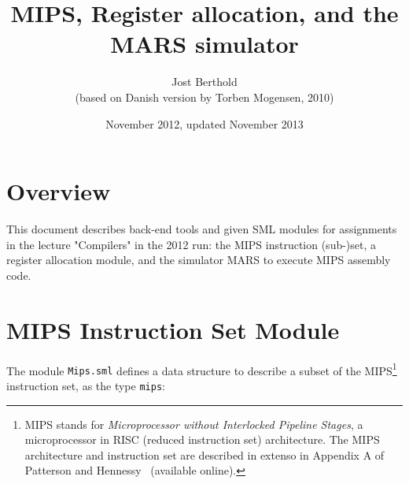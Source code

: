 \documentclass[11pt,a4paper]{article}
\title{MIPS, Register allocation, and the MARS simulator}
\author{Jost Berthold\\ (based on Danish version by Torben Mogensen, 2010)}
\date{November 2012, updated November 2013}
\newcommand{\codesize}{\scriptsize}
\newcommand{\cd}[1]{{{\codesize\tt #1}}}
\begin{document}
\setlength{\parindent}{0.2em}

\maketitle


\section*{Overview}

This document describes back-end tools and given SML modules for assignments 
in the lecture "Compilers" in the 2012 run: the MIPS instruction (sub-)set,
a register allocation module, and the simulator MARS to execute MIPS assembly code.

\tableofcontents

\section{MIPS Instruction Set Module}

The module \cd{Mips.sml} defines a data structure to describe a subset of the 
MIPS\footnote{MIPS stands for \emph{Microprocessor without 
Interlocked Pipeline Stages}, a microprocessor in RISC (reduced instruction set)
architecture. The MIPS architecture and instruction set are described in
 extenso in Appendix A of Patterson and
	 Hennessy~\cite{PattersonHennessy} (available online).}
instruction set, as the type \cd{mips}:
\end{document}

